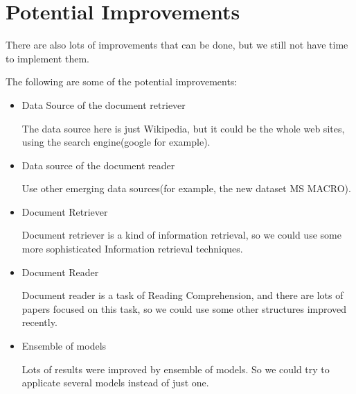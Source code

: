 \documentclass[12pt]{article}
\numberwithin{equation}{section}
\begin{document}
\section{Potential Improvements}
There are also lots of improvements that can be done, but we still not have time to implement them. \par
The following are some of the potential improvements:
	\begin{itemize}
		\item Data Source of the document retriever \par
		The data source here is just Wikipedia, but it could be the whole web sites, using the search engine(google for example).
		\item Data source of the document reader \par
		Use other emerging data sources(for example, the new dataset MS MACRO\citep{nguyen2016ms}).
		\item Document Retriever \par
		Document retriever is a kind of information retrieval, so we could use some more sophisticated Information retrieval techniques.
		\item Document Reader \par
		Document reader is a task of Reading Comprehension, and there are lots of papers focused on this task, so we could use some other structures improved recently.
		\item Ensemble of models \par
		Lots of results were improved by ensemble of models. So we could try to applicate several models instead of just one.
	\end{itemize}
\renewcommand\refname{Reference}


\clearpage
\end{document}
